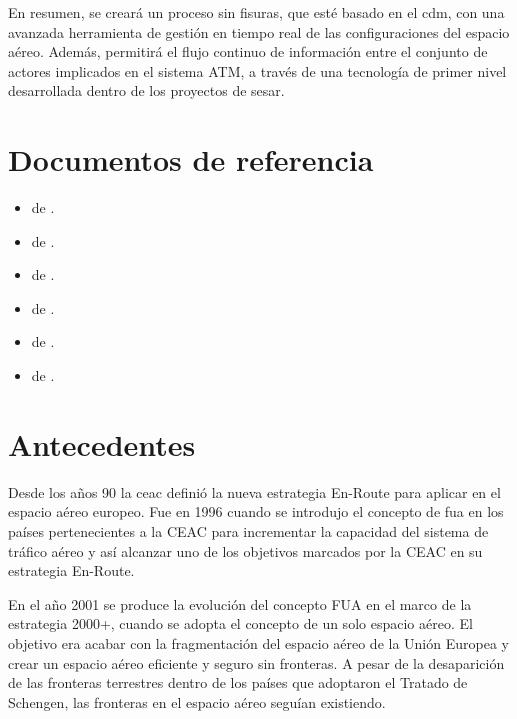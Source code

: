 En resumen, se creará un proceso sin fisuras, que esté basado en el \acrfull{cdm}, con una avanzada herramienta de gestión en tiempo real de las configuraciones del espacio aéreo. Además, permitirá el flujo continuo de información entre el conjunto de actores implicados en el sistema ATM, a través de una tecnología de primer nivel desarrollada dentro de los proyectos de \acrfull{sesar}.

\section{Documentos de referencia}

\begin{itemize}
    \item \textbf{} de \citeauthor{Eurocontrol2015AdvancedConcept}  \cite{Eurocontrol2015AdvancedConcept}.
    \item \textbf{} de \citeauthor{Eurocontrol2021EuropeanManagement}  \cite{Eurocontrol2021EuropeanManagement}.
    \item \textbf{} de \citeauthor{Eurocontrol2021FUA15.0}  \cite{Eurocontrol2021FUA15.0}.
    \item \textbf{} de \citeauthor{Eurocontrol2009SpecificationFUA}  \cite{Eurocontrol2009SpecificationFUA}.
    \item \textbf{} de \citeauthor{OACI2018Manual9971}  \cite{OACI2018Manual9971}.
    \item \textbf{} de \citeauthor{OACI2021Manual10088}  \cite{OACI2021Manual10088}.
\end{itemize}

\section{Antecedentes}

Desde los años 90 la \acrfull{ceac} definió la nueva estrategia En-Route para aplicar en el espacio aéreo europeo. Fue en 1996 cuando se introdujo el concepto de \acrfull{fua} en los países pertenecientes a la CEAC para incrementar la capacidad del sistema de tráfico aéreo y así alcanzar uno de los objetivos marcados por la CEAC en su estrategia En-Route. 
 
En el año 2001 se produce la evolución del concepto FUA en el marco de la estrategia 2000+, cuando se adopta el concepto de un solo espacio aéreo.  El objetivo era acabar con la fragmentación del espacio aéreo de la Unión Europea y crear un espacio aéreo eficiente y seguro sin fronteras. A pesar de la desaparición de las fronteras terrestres dentro de los países que adoptaron el Tratado de Schengen, las fronteras en el espacio aéreo seguían existiendo. 
 
